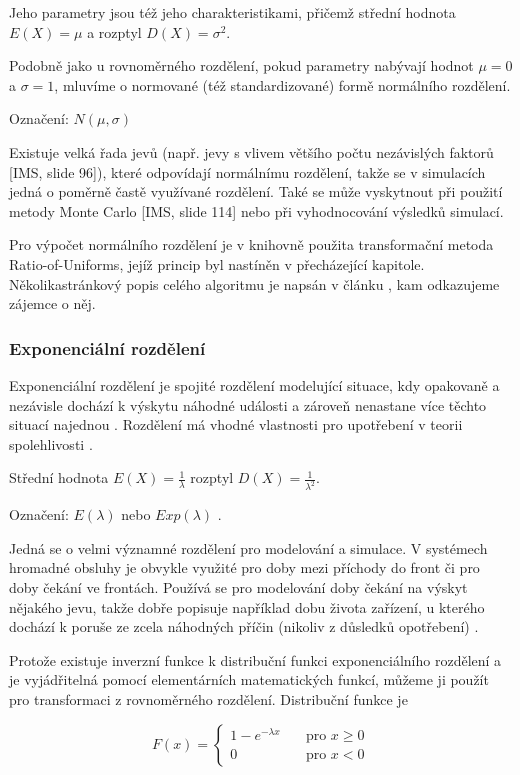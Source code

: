 \documentclass[a4paper,11pt]{article}
\begin{document}
Jeho parametry jsou též jeho charakteristikami, přičemž střední hodnota  $E(X) = \mu$ a rozptyl $D(X) = \sigma^2$.

Podobně jako u rovnoměrného rozdělení, pokud parametry nabývají hodnot $\mu = 0$ a $\sigma=1$, mluvíme o normované (též standardizované) formě normálního rozdělení. \cite{INM}

Označení: $N(\mu, \sigma)$

Existuje velká řada jevů (např. jevy s vlivem většího počtu nezávislých faktorů [IMS, slide 96]), které odpovídají normálnímu rozdělení, takže se v simulacích jedná o poměrně častě využívané rozdělení. Také se může vyskytnout při použití metody Monte Carlo [IMS, slide 114] nebo při vyhodnocování výsledků simulací.

Pro výpočet normálního rozdělení je v knihovně použita transformační metoda Ratio-of-Uniforms, jejíž princip byl nastíněn v přecházející kapitole. Několikastránkový popis celého algoritmu je napsán v článku \cite{Leva}, kam odkazujeme zájemce o něj.

\subsubsection{Exponenciální rozdělení}

Exponenciální rozdělení je spojité rozdělení modelující situace, kdy opakovaně a nezávisle dochází k výskytu náhodné události a zároveň nenastane více těchto situací najednou \cite{INM}. Rozdělení má vhodné vlastnosti pro upotřebení v teorii spolehlivosti \cite{IASTAT}.

Střední hodnota $E(X) = \frac{1}{\lambda}$ rozptyl $D(X)  =\frac{1}{\lambda^2}$.

Označení: $E(\lambda)$ nebo $Exp(\lambda)$ \cite{INM}.

Jedná se o velmi významné rozdělení pro modelování a simulace. V systémech hromadné obsluhy je  obvykle využité pro doby mezi příchody do front či pro doby čekání ve frontách. Používá se pro modelování doby čekání na výskyt nějakého jevu, takže dobře popisuje například dobu života zařízení, u kterého dochází k poruše ze zcela náhodných příčin (nikoliv z důsledků opotřebení) \cite{IASTAT}.

Protože existuje inverzní funkce k distribuční funkci exponenciálního rozdělení a je vyjádřitelná pomocí elementárních matematických funkcí, můžeme ji použít pro transformaci z rovnoměrného rozdělení. Distribuční funkce je 

$$
{F(x)} = \left\{
\begin{array}{ll}
 1 - e ^{-\lambda x} & \quad\text{pro } x \geq 0  \\
 0 & \quad\text{pro } x < 0
\end{array}
\right.
$$
\end{document}
